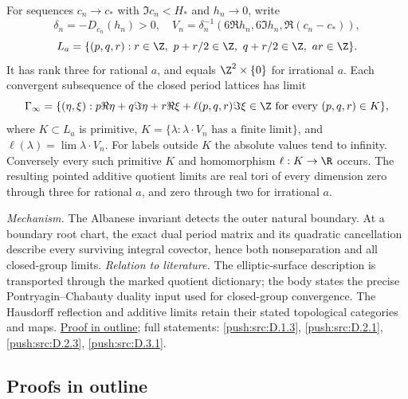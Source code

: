 For sequences $c_n\to c_*$ with $\Im c_n<H_*$ and $h_n\to0$,
write
\[
 \delta_n=-D_{c_n}(h_n)>0,\quad
 V_n=\delta_n^{-1}(6\Re h_n,6\Im h_n,\Re(c_n-c_*)),
\]
\[
 L_a=\{(p,q,r):r\in\Z,\ p+r/2\in\Z,
                      \ q+r/2\in\Z,\ ar\in\Z\}.
\]
It has rank three for rational $a$, and equals
$\Z^2\times\{0\}$ for irrational $a$.  Each convergent
subsequence of the closed period lattices has limit
\[
 \Gamma_\infty=\{(\eta,\xi):p\Re\eta+q\Im\eta+r\Re\xi
       +\ell(p,q,r)\Im\xi\in\Z\text{ for every }(p,q,r)\in K\},
\]
where $K\subset L_a$ is primitive,
$K=\{\lambda:\lambda\cdot V_n\text{ has a finite limit}\}$,
and $\ell(\lambda)=\lim\lambda\cdot V_n$.
For labels outside $K$ the absolute values tend to infinity.
Conversely every such primitive $K$ and homomorphism
$\ell:K\to\R$ occurs.  The resulting pointed additive quotient
limits are real tori of every dimension zero through three for
rational $a$, and zero through two for irrational $a$.

\textit{Mechanism.} The Albanese invariant detects the outer
natural boundary.  At a boundary root chart, the exact dual
period matrix and its quadratic cancellation describe every
surviving integral covector, hence both nonseparation and all
closed-group limits.
\textit{Relation to literature.} The elliptic-surface description
is transported through the marked quotient dictionary; the body
states the precise Pontryagin--Chabauty duality input used for
closed-group convergence.  The Hausdorff reflection and additive
limits retain their stated topological categories and maps.
\hyperlink{outline-I-G}{Proof in outline}; full statements:
\ref{push:src:D.1.3}, \ref{push:src:D.2.1},
\ref{push:src:D.2.3}, \ref{push:src:D.3.1}.

\subsection{Proofs in outline}
\label{series:I:outlines}

\hypertarget{outline-I-A}{}
